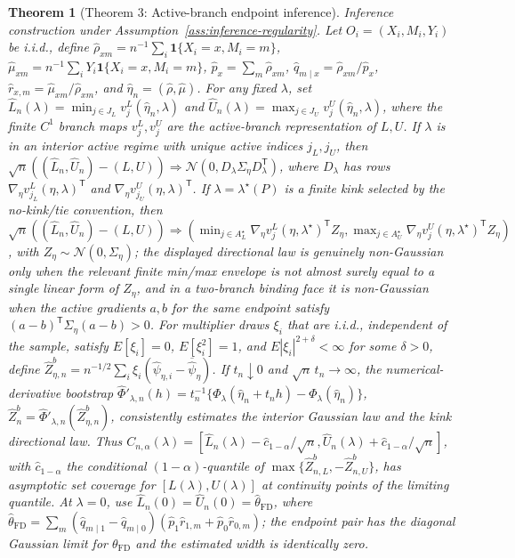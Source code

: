 \documentclass[11pt]{article}
\newcommand{\one}{\mathbf{1}}
\newcommand{\transpose}{\mathsf{T}}
\theoremstyle{definition}
\theoremstyle{plain}
\newtheorem{theorem}{Theorem}
\theoremstyle{remark}
\begin{document}
\begin{theorem}[Theorem 3: Active-branch endpoint inference]\label{thm:inference-active-branch}
Inference construction under Assumption~\ref{ass:inference-regularity}. Let \(O_i=(X_i,M_i,Y_i)\) be i.i.d., define \(\widehat\rho_{xm}=n^{-1}\sum_i\one\{X_i=x,M_i=m\}\), \(\widehat\mu_{xm}=n^{-1}\sum_iY_i\one\{X_i=x,M_i=m\}\), \(\widehat p_x=\sum_m\widehat\rho_{xm}\), \(\widehat q_{m\mid x}=\widehat\rho_{xm}/\widehat p_x\), \(\widehat r_{x,m}=\widehat\mu_{xm}/\widehat\rho_{xm}\), and \(\widehat\eta_n=(\widehat\rho,\widehat\mu)\). For any fixed \(\lambda\), set \(\widehat L_n(\lambda)=\min_{j\in J_L}v^L_j(\widehat\eta_n,\lambda)\) and \(\widehat U_n(\lambda)=\max_{j\in J_U}v^U_j(\widehat\eta_n,\lambda)\), where the finite \(C^1\) branch maps \(v^L_j,v^U_j\) are the active-branch representation of \(L,U\). If \(\lambda\) is in an interior active regime with unique active indices \(j_L,j_U\), then \(\sqrt n((\widehat L_n,\widehat U_n)-(L,U))\Rightarrow \mathcal N(0,D_\lambda\Sigma_\eta D_\lambda^\transpose)\), where \(D_\lambda\) has rows \(\nabla_\eta v^L_{j_L}(\eta,\lambda)^\transpose\) and \(\nabla_\eta v^U_{j_U}(\eta,\lambda)^\transpose\). If \(\lambda=\lambda^\star(P)\) is a finite kink selected by the no-kink/tie convention, then \(\sqrt n((\widehat L_n,\widehat U_n)-(L,U))\Rightarrow(\min_{j\in A_L^\star}\nabla_\eta v^L_j(\eta,\lambda^\star)^\transpose Z_\eta,\max_{j\in A_U^\star}\nabla_\eta v^U_j(\eta,\lambda^\star)^\transpose Z_\eta)\), with \(Z_\eta\sim\mathcal N(0,\Sigma_\eta)\); the displayed directional law is genuinely non-Gaussian only when the relevant finite min/max envelope is not almost surely equal to a single linear form of \(Z_\eta\), and in a two-branch binding face it is non-Gaussian when the active gradients \(a,b\) for the same endpoint satisfy \((a-b)^\transpose\Sigma_\eta(a-b)>0\). For multiplier draws \(\xi_i\) that are i.i.d., independent of the sample, satisfy \(E[\xi_i]=0\), \(E[\xi_i^2]=1\), and \(E|\xi_i|^{2+\delta}<\infty\) for some \(\delta>0\), define \(\widehat Z_{\eta,n}^b=n^{-1/2}\sum_i\xi_i(\widehat\psi_{\eta,i}-\overline{\widehat\psi}_\eta)\). If \(t_n\downarrow0\) and \(\sqrt n\,t_n\to\infty\), the numerical-derivative bootstrap \(\widehat\Phi'_{\lambda,n}(h)=t_n^{-1}\{\Phi_\lambda(\widehat\eta_n+t_nh)-\Phi_\lambda(\widehat\eta_n)\}\), \(\widehat Z_n^b=\widehat\Phi'_{\lambda,n}(\widehat Z_{\eta,n}^b)\), consistently estimates the interior Gaussian law and the kink directional law. Thus \(C_{n,\alpha}(\lambda)=[\widehat L_n(\lambda)-\widehat c_{1-\alpha}/\sqrt n,\widehat U_n(\lambda)+\widehat c_{1-\alpha}/\sqrt n]\), with \(\widehat c_{1-\alpha}\) the conditional \((1-\alpha)\)-quantile of \(\max\{\widehat Z_{n,L}^b,-\widehat Z_{n,U}^b\}\), has asymptotic set coverage for \([L(\lambda),U(\lambda)]\) at continuity points of the limiting quantile. At \(\lambda=0\), use \(\widehat L_n(0)=\widehat U_n(0)=\widehat\theta_{\mathrm{FD}}\), where \(\widehat\theta_{\mathrm{FD}}=\sum_m(\widehat q_{m\mid1}-\widehat q_{m\mid0})(\widehat p_1\widehat r_{1,m}+\widehat p_0\widehat r_{0,m})\); the endpoint pair has the diagonal Gaussian limit for \(\theta_{\mathrm{FD}}\) and the estimated width is identically zero.
\end{theorem}
\end{document}
